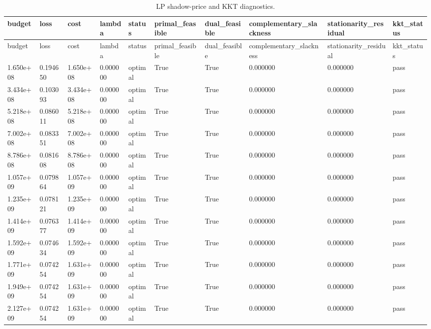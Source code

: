 \documentclass[11pt]{report}
\begin{document}
\begin{longtable}{llllllllll}
\caption{LP shadow-price and KKT diagnostics.}\\
\toprule
budget & loss & cost & lambda & status & primal\_feasible & dual\_feasible & complementary\_slackness & stationarity\_residual & kkt\_status \\
\midrule
\endfirsthead
\toprule
budget & loss & cost & lambda & status & primal\_feasible & dual\_feasible & complementary\_slackness & stationarity\_residual & kkt\_status \\
\midrule
\endhead
1.650e+08 & 0.194650 & 1.650e+08 & 0.000000 & optimal & True & True & 0.000000 & 0.000000 & pass \\
3.434e+08 & 0.103093 & 3.434e+08 & 0.000000 & optimal & True & True & 0.000000 & 0.000000 & pass \\
5.218e+08 & 0.086011 & 5.218e+08 & 0.000000 & optimal & True & True & 0.000000 & 0.000000 & pass \\
7.002e+08 & 0.083351 & 7.002e+08 & 0.000000 & optimal & True & True & 0.000000 & 0.000000 & pass \\
8.786e+08 & 0.081608 & 8.786e+08 & 0.000000 & optimal & True & True & 0.000000 & 0.000000 & pass \\
1.057e+09 & 0.079864 & 1.057e+09 & 0.000000 & optimal & True & True & 0.000000 & 0.000000 & pass \\
1.235e+09 & 0.078121 & 1.235e+09 & 0.000000 & optimal & True & True & 0.000000 & 0.000000 & pass \\
1.414e+09 & 0.076377 & 1.414e+09 & 0.000000 & optimal & True & True & 0.000000 & 0.000000 & pass \\
1.592e+09 & 0.074634 & 1.592e+09 & 0.000000 & optimal & True & True & 0.000000 & 0.000000 & pass \\
1.771e+09 & 0.074254 & 1.631e+09 & 0.000000 & optimal & True & True & 0.000000 & 0.000000 & pass \\
1.949e+09 & 0.074254 & 1.631e+09 & 0.000000 & optimal & True & True & 0.000000 & 0.000000 & pass \\
2.127e+09 & 0.074254 & 1.631e+09 & 0.000000 & optimal & True & True & 0.000000 & 0.000000 & pass \\
\bottomrule
\end{longtable}
\end{document}
